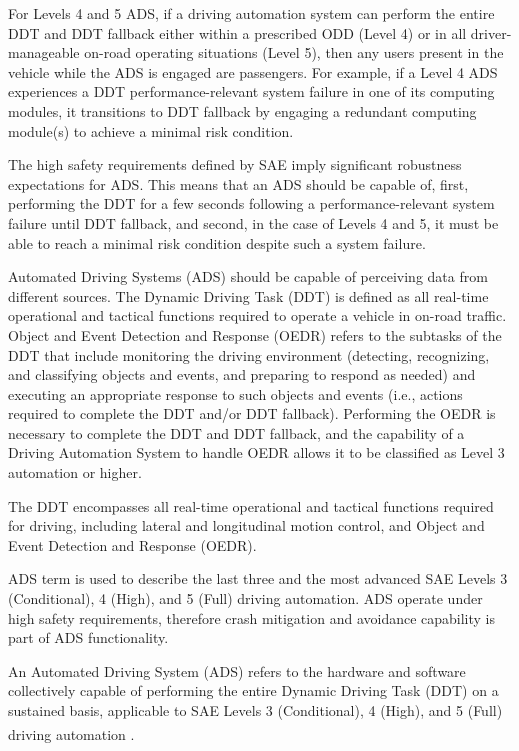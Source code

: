 For Levels 4 and 5 ADS, if a driving automation system can perform the entire DDT and DDT fallback either within a prescribed ODD (Level 4) or in all driver-manageable on-road operating situations (Level 5), then any users present in the vehicle while the ADS is engaged are passengers. For example, if a Level 4 ADS experiences a DDT performance-relevant system failure in one of its computing modules, it transitions to DDT fallback by engaging a redundant computing module(s) to achieve a minimal risk condition.

The high safety requirements defined by SAE imply significant robustness expectations for ADS. This means that an ADS should be capable of, first, performing the DDT for a few seconds following a performance-relevant system failure until DDT fallback, and second, in the case of Levels 4 and 5, it must be able to reach a minimal risk condition despite such a system failure\cite{sae:j3016:2021apr}.

Automated Driving Systems (ADS) should be capable of perceiving data from different sources. The Dynamic Driving Task (DDT) is defined as all real-time operational and tactical functions required to operate a vehicle in on-road traffic. Object and Event Detection and Response (OEDR) refers to the subtasks of the DDT that include monitoring the driving environment (detecting, recognizing, and classifying objects and events, and preparing to respond as needed) and executing an appropriate response to such objects and events (i.e., actions required to complete the DDT and/or DDT fallback). Performing the OEDR is necessary to complete the DDT and DDT fallback, and the capability of a Driving Automation System to handle OEDR allows it to be classified as Level 3 automation or higher.


The DDT encompasses all real-time operational and tactical functions required for driving, including lateral and longitudinal motion control, and Object and Event Detection and Response (OEDR).




ADS term is used to describe the last three and the most advanced SAE Levels 3 (Conditional), 4 (High), and 5 (Full) driving automation. ADS operate under high safety requirements, therefore crash mitigation and avoidance capability is part of ADS functionality.

An Automated Driving System (ADS) refers to the hardware and software
collectively capable of performing the entire Dynamic Driving Task (DDT)
on a sustained basis, applicable to SAE Levels 3 (Conditional), 4
(High), and 5 (Full) driving automation{ \textsuperscript{} }.

